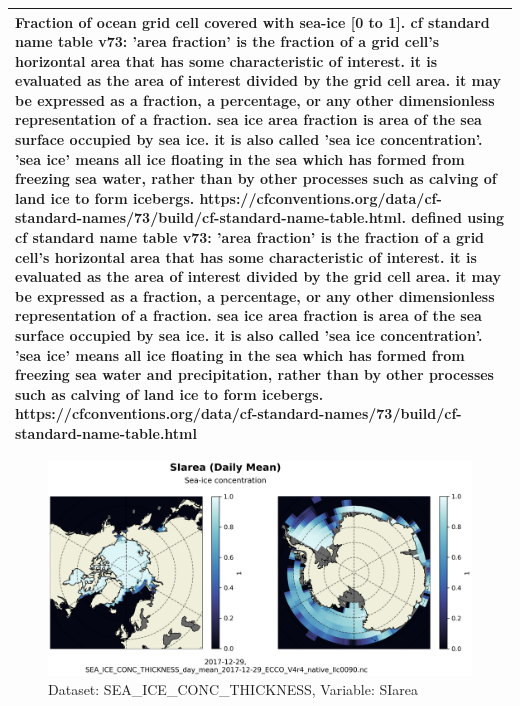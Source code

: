 \begin{longtable}{|m{}|m{}|m{}|m{}|}
\multicolumn{4}{|p{1\textwidth}|}{Fraction of ocean grid cell covered with sea-ice [0 to 1]. cf standard name table v73:  'area fraction' is the fraction of a grid cell's horizontal area that has some characteristic of interest. it is evaluated as the area of interest divided by the grid cell area. it may be expressed as a fraction, a percentage, or any other dimensionless representation of a fraction. sea ice area fraction is area of the sea surface occupied by sea ice. it is also called 'sea ice concentration'. 'sea ice' means all ice floating in the sea which has formed from freezing sea water, rather than by other processes such as calving of land ice to form icebergs. https://cfconventions.org/data/cf-standard-names/73/build/cf-standard-name-table.html. defined using cf standard name table v73: 'area fraction' is the fraction of a grid cell's horizontal area that has some characteristic of interest. it is evaluated as the area of interest divided by the grid cell area. it may be expressed as a fraction, a percentage, or any other dimensionless representation of a fraction. sea ice area fraction is area of the sea surface occupied by sea ice. it is also called 'sea ice concentration'. 'sea ice' means all ice floating in the sea which has formed from freezing sea water and precipitation, rather than by other processes such as calving of land ice to form icebergs. https://cfconventions.org/data/cf-standard-names/73/build/cf-standard-name-table.html} \\ \hline
\end{longtable}

\begin{figure}[H]
\centering
\includegraphics[scale=0.55]{../images/plots/native_plots/Sea-Ice_and_Snow_Concentration_and_Thickness/SIarea.png}
\caption{Dataset: SEA\_ICE\_CONC\_THICKNESS, Variable: SIarea}
\label{tab:table-SEA_ICE_CONC_THICKNESS_SIarea-Plot}
\end{figure}
\pagebreak

